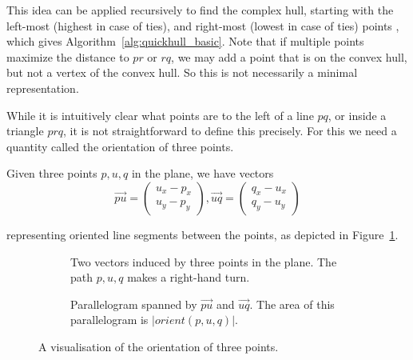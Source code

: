This idea can be applied recursively to find the complex hull, starting with
the left-most (highest in case of ties), and right-most (lowest in case of ties)
points \cite{Barber96}, which gives Algorithm~\ref{alg:quickhull_basic}.
Note that if multiple points maximize the distance to $pr$ or $rq$, we may add
a point that is on the convex hull, but not a vertex of the convex hull.
So this is not necessarily a minimal representation.

While it is intuitively clear what points are to the left of a line $pq$, or
inside a triangle $prq$, it is not straightforward to define this precisely.
For this we need a quantity called the orientation of three points.

Given three points $p, u, q$ in the plane, we have vectors
\[
    \vec{pu} = \begin{pmatrix}
        u_x - p_x \\
        u_y - p_y
    \end{pmatrix},
    \vec{uq} = \begin{pmatrix}
        q_x - u_x \\
        q_y - u_y
    \end{pmatrix}
\]

representing oriented line segments between the points, as depicted in
Figure~\ref{fig:orient1}.

\begin{figure}[ht]
    \begin{subfigure}{0.45\textwidth}
    \caption{Two vectors induced by three points in the plane. The path 
             $p, u, q$ makes a right-hand turn.}
    \label{fig:orient1}
    \end{subfigure}\hfill
    \begin{subfigure}{0.45\textwidth}
    \caption{Parallelogram spanned by $\vec{pu}$ and $\vec{uq}$. 
             The area of this parallelogram is $|orient(p, u, q)|$.}
    \label{fig:orient2}
    \end{subfigure}
    \caption{A visualisation of the orientation of three points.}
\end{figure}


